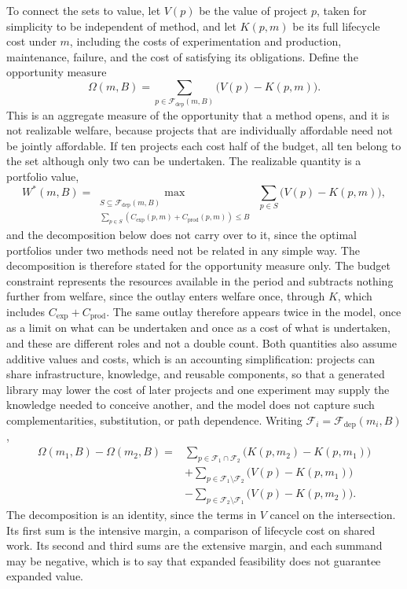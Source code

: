 \documentclass[11pt]{article}
\theoremstyle{remark}
\newcommand{\F}{\mathcal{F}}
\begin{document}
To connect the sets to value, let $V(p)$ be the value of project $p$, taken for simplicity to be independent of method, and let $K(p,m)$ be its full lifecycle cost under $m$, including the costs of experimentation and production, maintenance, failure, and the cost of satisfying its obligations. Define the opportunity measure
\[
\Omega(m,B)=\sum_{p\in\F_{\mathrm{dep}}(m,B)}\bigl(V(p)-K(p,m)\bigr).
\]
This is an aggregate measure of the opportunity that a method opens, and it is not realizable welfare, because projects that are individually affordable need not be jointly affordable. If ten projects each cost half of the budget, all ten belong to the set although only two can be undertaken. The realizable quantity is a portfolio value,
\[
W^{*}(m,B)=\max_{\substack{S\subseteq\F_{\mathrm{dep}}(m,B)\\ \sum_{p\in S}\left(C_{\mathrm{exp}}(p,m)+C_{\mathrm{prod}}(p,m)\right)\le B}}\ \sum_{p\in S}\bigl(V(p)-K(p,m)\bigr),
\]
and the decomposition below does not carry over to it, since the optimal portfolios under two methods need not be related in any simple way. The decomposition is therefore stated for the opportunity measure only. The budget constraint represents the resources available in the period and subtracts nothing further from welfare, since the outlay enters welfare once, through $K$, which includes $C_{\mathrm{exp}}+C_{\mathrm{prod}}$. The same outlay therefore appears twice in the model, once as a limit on what can be undertaken and once as a cost of what is undertaken, and these are different roles and not a double count. Both quantities also assume additive values and costs, which is an accounting simplification: projects can share infrastructure, knowledge, and reusable components, so that a generated library may lower the cost of later projects and one experiment may supply the knowledge needed to conceive another, and the model does not capture such complementarities, substitution, or path dependence. Writing $\F_i=\F_{\mathrm{dep}}(m_i,B)$,
\begin{align*}
\Omega(m_1,B)-\Omega(m_2,B)={}&\sum_{p\in\F_1\cap\F_2}\bigl(K(p,m_2)-K(p,m_1)\bigr)\\
&+\sum_{p\in\F_1\setminus\F_2}\bigl(V(p)-K(p,m_1)\bigr)\\
&-\sum_{p\in\F_2\setminus\F_1}\bigl(V(p)-K(p,m_2)\bigr).
\end{align*}
The decomposition is an identity, since the terms in $V$ cancel on the intersection. Its first sum is the intensive margin, a comparison of lifecycle cost on shared work. Its second and third sums are the extensive margin, and each summand may be negative, which is to say that expanded feasibility does not guarantee expanded value.
\end{document}
